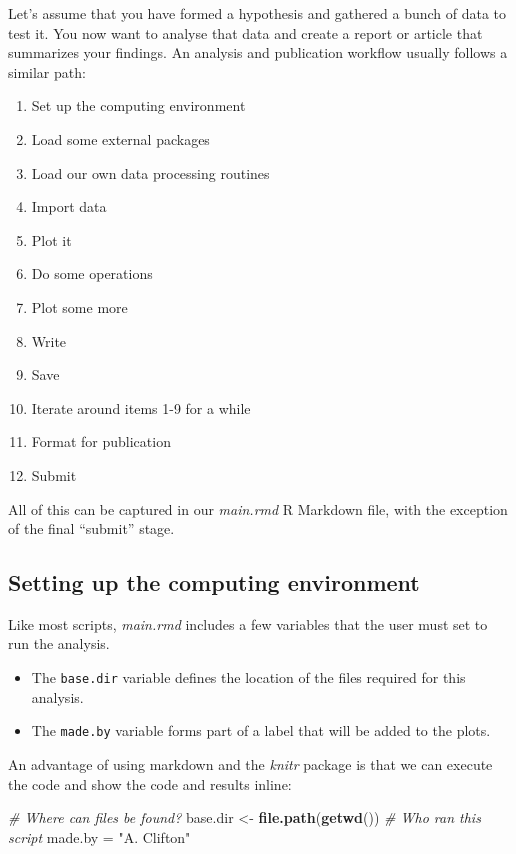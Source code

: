 \documentclass[11pt,]{article}
\newenvironment{Shaded}{\begin{snugshade}}{\end{snugshade}}
\newcommand{\CommentTok}[1]{\textcolor[rgb]{0.56,0.35,0.01}{\textit{#1}}}
\newcommand{\KeywordTok}[1]{\textcolor[rgb]{0.13,0.29,0.53}{\textbf{#1}}}
\newcommand{\NormalTok}[1]{#1}
\newcommand{\StringTok}[1]{\textcolor[rgb]{0.31,0.60,0.02}{#1}}
\providecommand{\tightlist}{%
  \setlength{\itemsep}{0pt}\setlength{\parskip}{0pt}}
\begin{document}
Let's assume that you have formed a hypothesis and gathered a bunch of data to test it. You now want to analyse that data and create a report or article that summarizes your findings. An analysis and publication workflow usually follows a similar path:

\begin{enumerate}
\def\labelenumi{\arabic{enumi}.}
\tightlist
\item
  Set up the computing environment
\item
  Load some external packages
\item
  Load our own data processing routines
\item
  Import data
\item
  Plot it
\item
  Do some operations
\item
  Plot some more
\item
  Write
\item
  Save
\item
  Iterate around items 1-9 for a while
\item
  Format for publication
\item
  Submit
\end{enumerate}

All of this can be captured in our \emph{main.rmd} R Markdown file, with the exception of the final ``submit'' stage.

\hypertarget{setting-up-the-computing-environment}{%
\subsection{Setting up the computing environment}\label{setting-up-the-computing-environment}}

Like most scripts, \emph{main.rmd} includes a few variables that the user must set to run the analysis.

\begin{itemize}
\tightlist
\item
  The \texttt{base.dir} variable defines the location of the files required for this analysis.
\item
  The \texttt{made.by} variable forms part of a label that will be added to the plots.
\end{itemize}

An advantage of using markdown and the \emph{knitr} package is that we can execute the code and show the code and results inline:

\begin{Shaded}
\begin{Highlighting}[]
\CommentTok{# Where can files be found?}
\NormalTok{base.dir <-}\StringTok{ }\KeywordTok{file.path}\NormalTok{(}\KeywordTok{getwd}\NormalTok{())}
\CommentTok{# Who ran this script}
\NormalTok{made.by =}\StringTok{ "A. Clifton"}
\end{Highlighting}
\end{Shaded}
\end{document}
